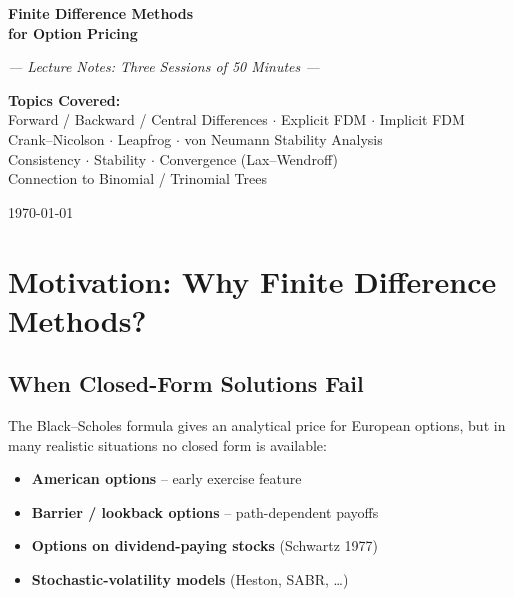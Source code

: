 \documentclass[12pt,a4paper]{article}
\theoremstyle{plain}
\theoremstyle{definition}
\theoremstyle{remark}
\begin{document}

\begin{titlepage}
  \centering
  \vspace*{2cm}
  {\Huge\bfseries Finite Difference Methods\\[0.4em]
   for Option Pricing\par}
  \vspace{0.6cm}
  {\large \itshape
   \textrm{---} Lecture Notes: Three Sessions of 50 Minutes \textrm{---}\par}
  \vspace{0.4cm}
  {\large
   \textbf{Topics Covered:}\\[0.3em]
   Forward / Backward / Central Differences $\cdot$
   Explicit FDM $\cdot$ Implicit FDM\\
   Crank--Nicolson $\cdot$ Leapfrog $\cdot$
   von Neumann Stability Analysis\\
   Consistency $\cdot$ Stability $\cdot$ Convergence (Lax--Wendroff)\\
   Connection to Binomial / Trinomial Trees\par}
  \vfill
  {\large\today}
\end{titlepage}

\tableofcontents
\newpage

\section{Motivation: Why Finite Difference Methods?}

\subsection{When Closed-Form Solutions Fail}

The Black--Scholes formula gives an analytical price for European options,
but in many realistic situations no closed form is available:
\begin{itemize}
  \item \textbf{American options} -- early exercise feature
  \item \textbf{Barrier / lookback options} -- path-dependent payoffs
  \item \textbf{Options on dividend-paying stocks} (Schwartz 1977)
  \item \textbf{Stochastic-volatility models} (Heston, SABR, \ldots)
\end{itemize}
\end{document}
